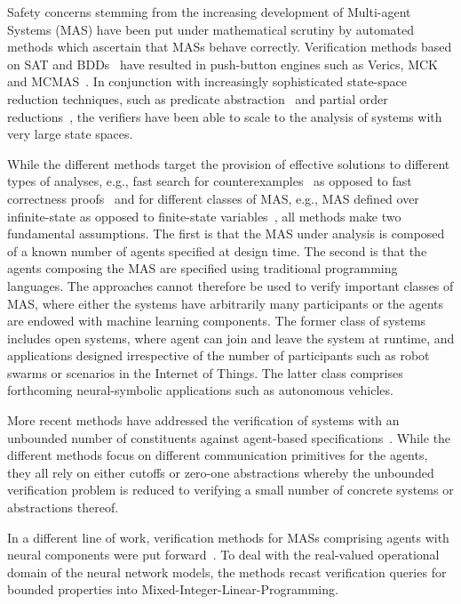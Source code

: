 Safety concerns stemming from the increasing development of Multi-agent Systems
(MAS) have been put under mathematical scrutiny
by automated methods which ascertain that MASs behave correctly. Verification
methods based on SAT and
BDDs~\cite{KacprzakLomuscioPenczek04b,RaimondiLomuscio05c} have resulted in
push-button engines such as Verics, MCK and
MCMAS~\cite{GammieMeyden04a,Kacprzak+07a,LomuscioQuRaimondi15}.  In conjunction
with increasingly sophisticated state-space reduction techniques, such as
predicate abstraction~\cite{lomuscio2015verifying} and partial order
reductions~\cite{jamroga2020towards}, the verifiers have been able to scale to
the analysis of systems with very large state spaces.


While the different methods target the provision of effective solutions to
different types of analyses, e.g., fast search for
counterexamples~\cite{penczek2003verifying} as opposed to fast correctness
proofs~\cite{ball2006abstraction} and for different classes of MAS, e.g., MAS
defined over infinite-state as opposed to finite-state
variables~\cite{lomuscio2015verifying}, all methods make two fundamental
assumptions. The first is that the MAS under analysis is composed of a known
number of agents specified at design time. The second is that the agents
composing the MAS are specified using traditional programming languages.  The
approaches cannot
therefore be used to verify important classes of MAS, where either the systems
have arbitrarily many participants or the agents are endowed with machine
learning components. The former class of systems includes open systems, where
agent can join and leave the system at runtime, and applications designed
irrespective of the number of participants such as robot swarms or scenarios
in the Internet of Things. The latter class comprises forthcoming
neural-symbolic applications such as autonomous vehicles.

More recent methods have addressed the verification of systems with an unbounded
number of constituents against agent-based
specifications~\cite{KouvarosLomuscio16a,KouvarosLomuscio15b,KouvarosLomuscio16c}.
While the different methods focus on different communication primitives for the
agents, they all rely on either cutoffs or zero-one abstractions whereby
the unbounded verification problem is reduced to verifying a small
number of concrete systems or abstractions thereof.  

In a different line of work, verification methods for MASs comprising agents
with neural components were put forward~\cite{Akintunde+20b,Akintunde+22}. To
deal with the real-valued operational domain of the neural network models, the
methods recast verification queries for bounded properties into
Mixed-Integer-Linear-Programming.


